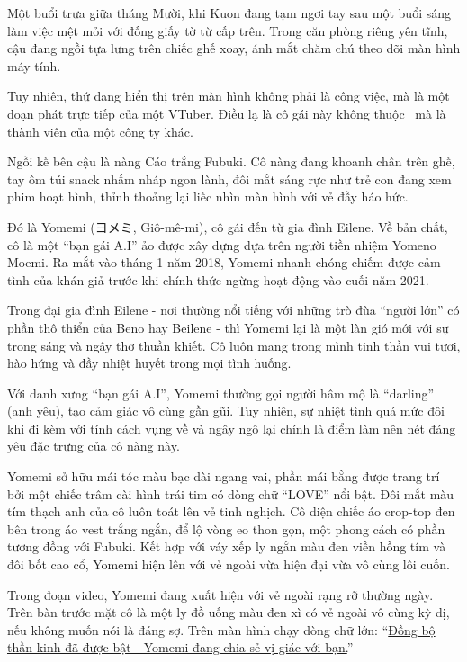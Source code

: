 \documentclass[../main.tex]{subfiles}
\begin{document}
Một buổi trưa giữa tháng Mười, khi Kuon đang tạm ngơi tay sau một buổi sáng làm việc mệt mỏi với đống giấy tờ từ cấp trên. Trong căn phòng riêng yên tĩnh, cậu đang ngồi tựa lưng trên chiếc ghế xoay, ánh mắt chăm chú theo dõi màn hình máy tính.


Tuy nhiên, thứ đang hiển thị trên màn hình không phải là công việc, mà là một đoạn phát trực tiếp của một VTuber. Điều lạ là cô gái này không thuộc \hll\ mà là thành viên của một công ty khác.

Ngồi kế bên cậu là nàng Cáo trắng Fubuki. Cô nàng đang khoanh chân trên ghế, tay ôm túi snack nhấm nháp ngon lành, đôi mắt sáng rực như trẻ con đang xem phim hoạt hình, thỉnh thoảng lại liếc nhìn màn hình với vẻ đầy háo hức.

\chrint

Đó là Yomemi (ヨメミ, Giô-mê-mi), cô gái đến từ gia đình Eilene. Về bản chất, cô là một ``bạn gái A.I'' ảo được xây dựng dựa trên người tiền nhiệm Yomeno Moemi. Ra mắt vào tháng 1 năm 2018, Yomemi nhanh chóng chiếm được cảm tình của khán giả trước khi chính thức ngừng hoạt động vào cuối năm 2021.

Trong đại gia đình Eilene - nơi thường nổi tiếng với những trò đùa ``người lớn'' có phần thô thiển của Beno hay Beilene - thì Yomemi lại là một làn gió mới với sự trong sáng và ngây thơ thuần khiết. Cô luôn mang trong mình tinh thần vui tươi, hào hứng và đầy nhiệt huyết trong mọi tình huống.

Với danh xưng ``bạn gái A.I'', Yomemi thường gọi người hâm mộ là ``darling'' (anh yêu), tạo cảm giác vô cùng gần gũi. Tuy nhiên, sự nhiệt tình quá mức đôi khi đi kèm với tính cách vụng về và ngây ngô lại chính là điểm làm nên nét đáng yêu đặc trưng của cô nàng này.

Yomemi sở hữu mái tóc màu bạc dài ngang vai, phần mái bằng được trang trí bởi một chiếc trâm cài hình trái tim có dòng chữ ``LOVE'' nổi bật. Đôi mắt màu tím thạch anh của cô luôn toát lên vẻ tinh nghịch. Cô diện chiếc áo crop-top đen bên trong áo vest trắng ngắn, để lộ vòng eo thon gọn, một phong cách có phần tương đồng với Fubuki. Kết hợp với váy xếp ly ngắn màu đen viền hồng tím và đôi bốt cao cổ, Yomemi hiện lên với vẻ ngoài vừa hiện đại vừa vô cùng lôi cuốn.

\chrint


Trong đoạn video, Yomemi đang xuất hiện với vẻ ngoài rạng rỡ thường ngày. Trên bàn trước mặt cô là một ly đồ uống màu đen xì có vẻ ngoài vô cùng kỳ dị, nếu không muốn nói là đáng sợ. Trên màn hình chạy dòng chữ lớn: ``\uline{Đồng bộ thần kinh đã được bật - Yomemi đang chia sẻ vị giác với bạn.}''
\end{document}
